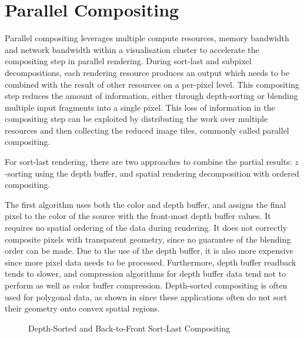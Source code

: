 \section{Parallel Compositing\label{sparcomp}}

Parallel compositing leverages multiple compute resources, memory bandwidth and
network bandwidth within a visualisation cluster to accelerate the compositing
step in parallel rendering. During sort-last and subpixel decompositions, each
rendering resource produces an output which needs to be combined with the
result of other resources on a per-pixel level. This compositing step reduces
the amount of information, either through depth-sorting or blending multiple
input fragments into a single pixel. This loss of information in the
compositing step can be exploited by distributing the work over multiple
resources and then collecting the reduced image tiles, commonly called parallel
compositing.

For sort-last rendering, there are two approaches to combine the partial
results: $z$-sorting using the depth buffer, and spatial rendering
decomposition with ordered compositing.

The first algorithm uses both the color and depth buffer, and assigns the final
pixel to the color of the source with the front-most depth buffer values. It
requires no spatial ordering of the data during rendering. It does not
correctly composite pixels with transparent geometry, since no guarantee of the
blending order can be made. Due to the use of the depth buffer, it is also more
expensive since more pixel data needs to be processed. Furthermore, depth
buffer readback tends to slower, and compression algorithms for depth buffer
data tend not to perform as well as color buffer compression. Depth-sorted
compositing is often used for polygonal data, as shown in  since
these applications often do not sort their geometry onto convex spatial
regions.

\begin{figure}[h!t]\center
  \hfil
  \caption{Depth-Sorted and Back-to-Front Sort-Last Compositing}
\end{figure}

